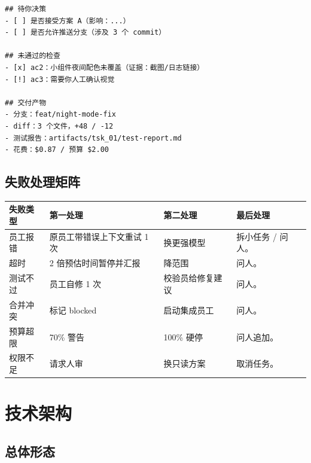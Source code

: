 \documentclass[UTF8,11pt,a4paper,fontset=windows]{ctexart}
\let\ocsection\section
\renewcommand{\section}{\Needspace{8\baselineskip}\ocsection}
\let\ocsubsection\subsection
\renewcommand{\subsection}{\Needspace{5\baselineskip}\ocsubsection}
\begin{document}
\begin{lstlisting}[caption={任务结束时的固定汇总格式},label={lst:summary}]
## 待你决策
- [ ] 是否接受方案 A（影响：...）
- [ ] 是否允许推送分支（涉及 3 个 commit）

## 未通过的检查
- [x] ac2：小组件夜间配色未覆盖（证据：截图/日志链接）
- [!] ac3：需要你人工确认视觉

## 交付产物
- 分支：feat/night-mode-fix
- diff：3 个文件，+48 / -12
- 测试报告：artifacts/tsk_01/test-report.md
- 花费：$0.87 / 预算 $2.00
\end{lstlisting}

\subsection{失败处理矩阵}

\noindent\begin{minipage}{\linewidth}
\centering
{}
\small
\begin{tabularx}{\linewidth}{@{}p{2.8cm} X X X@{}}
\toprule
\textbf{失败类型} & \textbf{第一处理} & \textbf{第二处理} & \textbf{最后处理} \\
\midrule
员工报错 & 原员工带错误上下文重试 1 次 & 换更强模型 & 拆小任务 / 问人。 \\
超时 & 2 倍预估时间暂停并汇报 & 降范围 & 问人。 \\
测试不过 & 员工自修 1 次 & 校验员给修复建议 & 问人。 \\
合并冲突 & 标记 blocked & 启动集成员工 & 问人。 \\
预算超限 & 70\% 警告 & 100\% 硬停 & 问人追加。 \\
权限不足 & 请求人审 & 换只读方案 & 取消任务。 \\
\bottomrule
\end{tabularx}
\end{minipage}

\section{技术架构}
\label{sec:architecture}

\subsection{总体形态}
\end{document}
